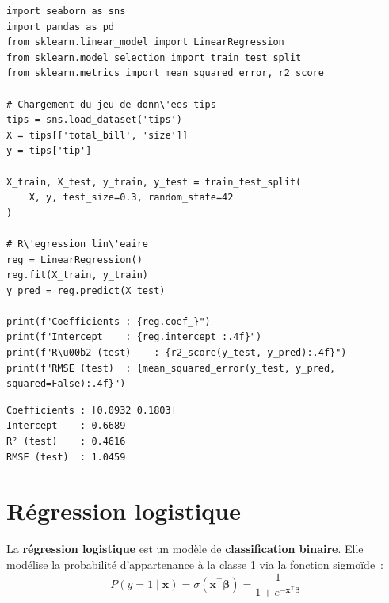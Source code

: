 \begin{codeblock}[title=\textbf{Python}]
\begin{verbatim}
import seaborn as sns
import pandas as pd
from sklearn.linear_model import LinearRegression
from sklearn.model_selection import train_test_split
from sklearn.metrics import mean_squared_error, r2_score

# Chargement du jeu de donn\'ees tips
tips = sns.load_dataset('tips')
X = tips[['total_bill', 'size']]
y = tips['tip']

X_train, X_test, y_train, y_test = train_test_split(
    X, y, test_size=0.3, random_state=42
)

# R\'egression lin\'eaire
reg = LinearRegression()
reg.fit(X_train, y_train)
y_pred = reg.predict(X_test)

print(f"Coefficients : {reg.coef_}")
print(f"Intercept    : {reg.intercept_:.4f}")
print(f"R\u00b2 (test)    : {r2_score(y_test, y_pred):.4f}")
print(f"RMSE (test)  : {mean_squared_error(y_test, y_pred, squared=False):.4f}")
\end{verbatim}
\end{codeblock}

\begin{codeoutput}
\begin{verbatim}
Coefficients : [0.0932 0.1803]
Intercept    : 0.6689
R² (test)    : 0.4616
RMSE (test)  : 1.0459
\end{verbatim}
\end{codeoutput}

\section{R\'egression logistique}
\label{sec:regression_logistique}


\begin{definition}
La \textbf{r\'egression logistique} est un mod\`ele de \textbf{classification binaire}. Elle mod\'elise la probabilit\'e d'appartenance \`a la classe 1 via la fonction sigmo\"ide~:
\[
P(y=1 \mid \mathbf{x}) = \sigma(\mathbf{x}^\top \boldsymbol{\beta}) = \frac{1}{1 + e^{-\mathbf{x}^\top \boldsymbol{\beta}}}
\]
\end{definition}

\begin{center}
\end{center}

